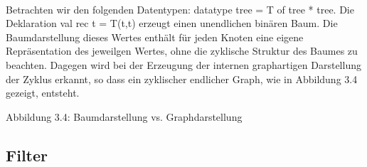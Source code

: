 \documentclass[12pt,a4paper]{article}
\begin{document}
\paragraph{}

Betrachten wir den folgenden Datentypen: \newline
datatype tree = T of tree * tree. \newline
Die Deklaration \newline
 val rec t = T(t,t)  \newline
erzeugt einen unendlichen bin\"aren Baum. 
Die Baumdarstellung dieses Wertes 
enth\"alt f\"ur jeden Knoten  
eine eigene Repr\"asentation des jeweilgen Wertes, 
ohne die zyklische Struktur des Baumes zu beachten. 
Dagegen wird bei der Erzeugung der internen graphartigen
Darstellung der Zyklus erkannt, so dass ein zyklischer endlicher
Graph, wie in Abbildung 3.4 gezeigt, entsteht. 

\begin{center}
\linebreak 
Abbildung 3.4: Baumdarstellung vs. Graphdarstellung
\end{center}


\subsection{Filter}

\paragraph{}
\end{document}
